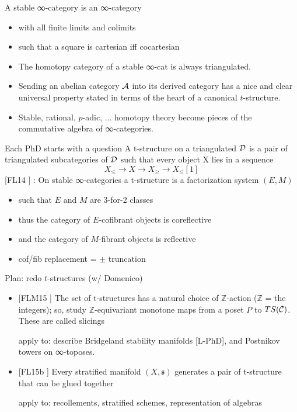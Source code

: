 \documentclass[handout]{beamer}
\def\lnk#1{\href{#1}{\faFilePdfO}}
\begin{document}
%
%
%
%
%
\begin{frame}
  A \alert{stable ∞-category} is an ∞-category
\begin{itemize}
\item with all \alert{finite limits and colimits}
\item such that a square is \alert{cartesian iff cocartesian}
\end{itemize}
\begin{itemize}
\item<+-> The homotopy category of a stable ∞-cat is always triangulated.
\item<+-> Sending an abelian category $\cal A$ into its derived category has a nice and clear \alert{universal property} stated in terms of the heart of a canonical $t$-structure.
\item<+-> Stable, rational, $p$-adic, ...  homotopy theory become pieces of the commutative algebra of  ∞-categories.
\end{itemize}
\end{frame}
%
%
%
%
%
\begin{frame}{Each PhD starts with a question}
  A \alert{t-structure} on a triangulated $\cal D$ is a pair of triangulated subcategories of $\cal D$ such that every object X lies in a sequence
\[X_{\le} \to X \to X_\ge \to X_\le[1]\]
[\alert{FL14} \lnk{https://link.springer.com/article/10.1007/s10485-015-9393-z}] : On stable ∞-categories a t-structure is a factorization system $(E,M)$
\begin{itemize}
\item<+-> such that $E$ and $M$ are 3-for-2 classes
\item<+-> thus the category of $E$-cofibrant objects is coreflective
\item<+-> and the category of $M$-fibrant objects is reflective
\item<+-> cof/fib replacement = $\pm$ truncation
\end{itemize}
\end{frame}
%
%
%
\begin{frame}{Plan: redo $t$-structures (w/ Domenico)}
  \begin{itemize}
\item<+-> {} [\alert{FLM15} \lnk{https://link.springer.com/article/10.1007/s40062-019-00237-0}] The set of t-structures has a natural choice of $\mathbb Z$-action ($\mathbb Z$ = the integers); so, study $\mathbb Z$-equivariant monotone maps from a poset $P$ to $TS(\cal C)$. These are called \alert{slicings}

{\footnotesize\color{gray!40} apply to: describe Bridgeland stability manifolds [\alert{L-PhD\lnk{http://tetrapharmakon.github.io/stuff/main.pdf}}], and Postnikov towers on ∞-toposes.}

\item<+-> {} [\alert{FL15b} \lnk{https://arxiv.org/abs/1507.03913}] Every stratified manifold $(X,\mathfrak s)$ generates a pair of t-structure that can be glued together

{\footnotesize\color{gray!40} apply to: recollements, stratified schemes, representation of algebras}

  \end{itemize}
\end{frame}
\end{document}
